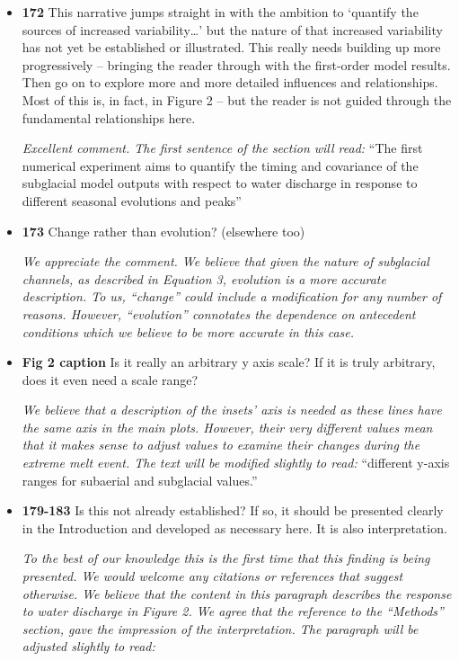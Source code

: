 \documentclass[11pt]{article}
\begin{document}
\begin{itemize}
\item \textbf{172} This narrative jumps straight in with the ambition to ‘quantify the sources
  of increased variability…’ but the nature of that increased variability has not
  yet be established or illustrated. This really needs building up more
  progressively – bringing the reader through with the first-order model
  results. Then go on to explore more and more detailed influences and
  relationships. Most of this is, in fact, in Figure 2 – but the reader is not
  guided through the fundamental relationships here.

 \textit{Excellent comment. The first sentence of the section will read:} ``The first numerical experiment aims to quantify the timing and covariance of the subglacial model outputs with respect to water discharge in response to different seasonal evolutions and peaks''

\item \textbf{173} Change rather than evolution? (elsewhere too)

  \textit{We appreciate the comment. We believe that given the nature of subglacial channels, as described in Equation 3, evolution is a more accurate description. To us, ``change'' could include a modification for any number of reasons. However,
    ``evolution'' connotates the dependence on antecedent conditions which we believe to be more accurate in this case. }
  
\item \textbf{Fig 2 caption} Is it really an arbitrary y axis scale? If it is truly arbitrary, does it even need
  a scale range?

  \textit{We believe that a description of the insets' axis is needed as these lines have the same axis in the main plots. However, their very different values mean that it makes sense to adjust values to examine their changes during the extreme melt event. The text will be modified slightly to read:} ``different y-axis ranges for subaerial and subglacial values.''


  
\item \textbf{179-183} Is this not already established? If so, it should be presented clearly in the
  Introduction and developed as necessary here. It is also interpretation.

  \textit{ To the best of our knowledge this is the first time that this finding is being presented.
    We would welcome any citations or references that suggest otherwise. We believe that the content in this paragraph describes the response to water discharge in Figure 2. We agree that the reference to the ``Methods'' section, gave the impression of the interpretation. The paragraph will be adjusted slightly to read:}



\end{itemize}
\end{document}
